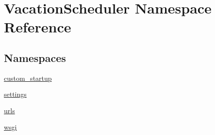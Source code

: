 \hypertarget{namespaceVacationScheduler}{\section{Vacation\-Scheduler Namespace Reference}
\label{namespaceVacationScheduler}
}
\subsection*{Namespaces}
\begin{DoxyCompactItemize}
\item 
\hyperlink{namespaceVacationScheduler_1_1custom__startup}{custom\-\_\-startup}
\item 
\hyperlink{namespaceVacationScheduler_1_1settings}{settings}
\item 
\hyperlink{namespaceVacationScheduler_1_1urls}{urls}
\item 
\hyperlink{namespaceVacationScheduler_1_1wsgi}{wsgi}
\end{DoxyCompactItemize}
